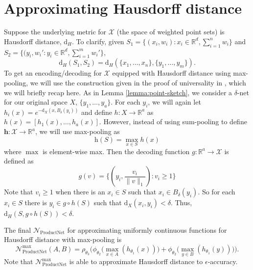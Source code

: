 \documentclass[12pt]{article}
\newcommand{\R}{\mathbb R}
\newcommand{\Network}{\mathcal{N}_{\mathrm{ProductNet}}}
\begin{document}
\section{Approximating Hausdorff distance}
\label{appendix:hausdorff}
Suppose the underlying metric for $\mathcal{X}$ (the space of weighted point sets) is Hausdorff distance, $\mathrm{d}_H$. To clarify, given $S_1 = \{(x_i, w_i) : x_i \in \R^d, \sum_{i = 1}^n w_i\}$ and $S_2 = \{(y_i, w_i': y_i \in \R^d, \sum_{i = 1}^m w_i'\}$, 
\begin{equation*}
    \mathrm{d}_H(S_1, S_2) = \mathrm{d}_H(\{x_1, \dots, x_n\}, \{y_1, \dots, y_m\}).
\end{equation*}
To get an encoding/decoding for $\mathcal{X}$ equipped with Hausdorff distance using max-pooling, we will use the construction given in the proof of universality in \citep{qi2017pointnet}, which we will briefly recap here.
As in Lemma \ref{lemma:point-sketch}, we consider a $\delta$-net for our original space $X$, $\{y_1, \dots, y_a\}$. For each $y_i$, we will again let $h_i(x) = e^{-\mathrm{d}_X(x, B_{\delta}(y_i))}$ and define $h: X \to \R^a$ as $h(x) = [h_1(x), \dots, h_a(x)]$. However, instead of using sum-pooling to define $\mathbf{h}: \mathcal{X} \to \R^a$, we will use max-pooling as
\begin{equation*}
    \mathrm{h}(S) = \max_{x \in S} h(x)
\end{equation*}
where $\max$ is element-wise max.
Then the decoding function $g: \R^a \to \mathcal{X}$ is defined as 
\begin{equation*}
    g(v) = \{ (y_i, \frac{v_i}{\|v\|_1}) : v_i \geq 1\}
\end{equation*}
Note that $v_i \geq 1$ when there is an $x_i \in S$ such that $x_i \in B_{\delta}(y_i)$. So for each $x_i \in S$ there is $y_i \in g \circ h(S)$ such that $\mathrm{d}_X(x_i, y_i) < \delta$. Thus, $\mathrm{d}_H(S, g\circ h(S)) < \delta$.

The final $\Network$ for approximating uniformly continuous functions for Hausdorff distance with max-pooling is
\begin{equation*}
    \Network^{\max} (A, B) = \rho_{\theta_3}\Bigg( \phi_{\theta_2}\Big(\max_{x \in A}(h_{\theta_1}(x))\Big) + \phi_{\theta_2} \Big(\max_{y \in B}(h_{\theta_1}(y))\Big)\Bigg).
\end{equation*}
Note that $\Network^{\max}$ is able to approximate Hausdorff distance to $\epsilon$-accuracy. 
\end{document}
